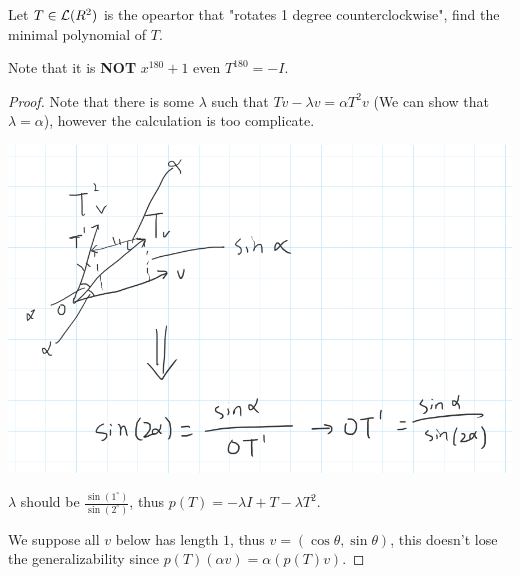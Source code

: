 \documentclass[../main.tex]{subfiles}
\begin{document}
\begin{exercise}
  Let $T \in \mathcal{L}(R^2)$ is the opeartor that "rotates 1 degree counterclockwise",
  find the minimal polynomial of $T$.

  Note that it is \textbf{NOT} $x^{180} + 1$ even $T^{180} = -I$.
\end{exercise}
\begin{proof}
  Note that there is some $\lambda$ such that $Tv - \lambda v = \alpha T^2 v$ (We can show that $\lambda = \alpha$),
  however the calculation is too complicate.

  \includegraphics[scale=0.6]{E5B-8-resource}

  $\lambda$ should be $\frac{\sin(1^{\circ})}{\sin(2^\circ)}$, thus
  $p(T) = - \lambda I + T - \lambda T^2$.

  We suppose all $v$ below has length $1$, thus $v = (\cos \theta, \sin \theta)$,
  this doesn't lose the generalizability since $p(T)(\alpha v) = \alpha (p(T)v)$.


\end{proof}
\end{document}
